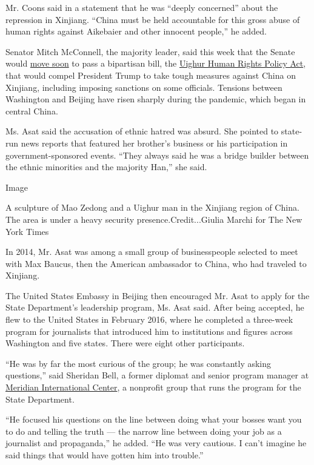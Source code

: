 Mr. Coons said in a statement that he was ``deeply concerned'' about the
repression in Xinjiang. ``China must be held accountable for this gross
abuse of human rights against Aikebaier and other innocent people,'' he
added.

Senator Mitch McConnell, the majority leader, said this week that the
Senate would
\href{https://www.reuters.com/article/us-usa-china-xinjiang/senate-leader-expects-vote-soon-on-seeking-china-sanctions-over-uighurs-idUSKBN22J3E4?il=0}{move
soon} to pass a bipartisan bill, the
\href{https://www.nytimes.com/2019/12/27/us/politics/trumps-human-rights-congress.html}{Uighur
Human Rights Policy Act}, that would compel President Trump to take
tough measures against China on Xinjiang, including imposing sanctions
on some officials. Tensions between Washington and Beijing have risen
sharply during the pandemic, which began in central China.

Ms. Asat said the accusation of ethnic hatred was absurd. She pointed to
state-run news reports that featured her brother's business or his
participation in government-sponsored events. ``They always said he was
a bridge builder between the ethnic minorities and the majority Han,''
she said.

Image

A sculpture of Mao Zedong and a Uighur man in the Xinjiang region of
China. The area is under a heavy security presence.Credit...Giulia
Marchi for The New York Times

In 2014, Mr. Asat was among a small group of businesspeople selected to
meet with Max Baucus, then the American ambassador to China, who had
traveled to Xinjiang.

The United States Embassy in Beijing then encouraged Mr. Asat to apply
for the State Department's leadership program, Ms. Asat said. After
being accepted, he flew to the United States in February 2016, where he
completed a three-week program for journalists that introduced him to
institutions and figures across Washington and five states. There were
eight other participants.

``He was by far the most curious of the group; he was constantly asking
questions,'' said Sheridan Bell, a former diplomat and senior program
manager at \href{https://www.meridian.org/}{Meridian International
Center}, a nonprofit group that runs the program for the State
Department.

``He focused his questions on the line between doing what your bosses
want you to do and telling the truth --- the narrow line between doing
your job as a journalist and propaganda,'' he added. ``He was very
cautious. I can't imagine he said things that would have gotten him into
trouble.''

